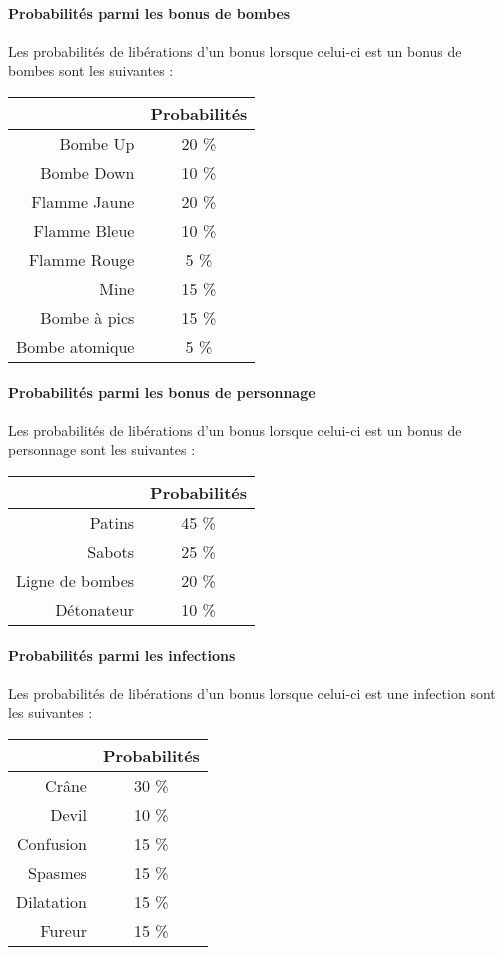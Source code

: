 \paragraph{Probabilités parmi les bonus de bombes}
Les probabilités de libérations d'un bonus lorsque celui-ci est un bonus de bombes sont les suivantes :
\begin{center}
\begin{tabular}{|r|c|}
\hline 
& Probabilités \\ 
\hline 
Bombe Up & 20 \% \\ 
\hline 
Bombe Down & 10 \% \\ 
\hline 
Flamme Jaune & 20 \% \\ 
\hline 
Flamme Bleue & 10 \% \\ 
\hline 
Flamme Rouge & 5 \% \\ 
\hline 
Mine & 15 \% \\ 
\hline 
Bombe à pics & 15 \% \\ 
\hline 
Bombe atomique & 5 \% \\ 
\hline 
\end{tabular} 
\end{center}

\paragraph{Probabilités parmi les bonus de personnage}
Les probabilités de libérations d'un bonus lorsque celui-ci est un bonus de personnage sont les suivantes :
\begin{center}
\begin{tabular}{|r|c|}
\hline 
& Probabilités \\ 
\hline 
Patins & 45 \% \\ 
\hline 
Sabots & 25 \% \\ 
\hline 
Ligne de bombes & 20 \% \\ 
\hline 
Détonateur & 10 \% \\ 
\hline 
\end{tabular} 
\end{center}

\paragraph{Probabilités parmi les infections}
Les probabilités de libérations d'un bonus lorsque celui-ci est une infection sont les suivantes :
\begin{center}
\begin{tabular}{|r|c|}
\hline 
& Probabilités \\ 
\hline 
Crâne & 30 \% \\ 
\hline 
Devil & 10 \% \\ 
\hline 
Confusion & 15 \% \\ 
\hline 
Spasmes & 15 \% \\ 
\hline 
Dilatation & 15 \% \\ 
\hline 
Fureur & 15 \% \\ 
\hline 
\end{tabular} 
\end{center}
